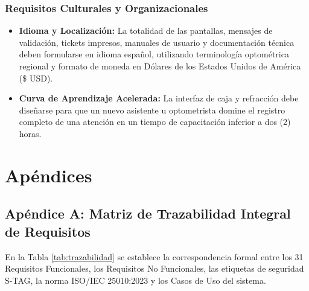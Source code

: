 \documentclass[12pt,a4paper]{report}
\begin{document}
\subsection{Requisitos Culturales y Organizacionales}
\begin{itemize}
    \item \textbf{Idioma y Localización:} La totalidad de las pantallas, mensajes de validación, tickets impresos, manuales de usuario y documentación técnica deben formularse en idioma español, utilizando terminología optométrica regional y formato de moneda en Dólares de los Estados Unidos de América (\$ USD).
    \item \textbf{Curva de Aprendizaje Acelerada:} La interfaz de caja y refracción debe diseñarse para que un nuevo asistente u optometrista domine el registro completo de una atención en un tiempo de capacitación inferior a dos (2) horas.
\end{itemize}

\chapter{Apéndices}

\section*{Apéndice A: Matriz de Trazabilidad Integral de Requisitos}
En la Tabla \ref{tab:trazabilidad} se establece la correspondencia formal entre los 31 Requisitos Funcionales, los Requisitos No Funcionales, las etiquetas de seguridad S-TAG, la norma ISO/IEC 25010:2023 y los Casos de Uso del sistema.
\end{document}
